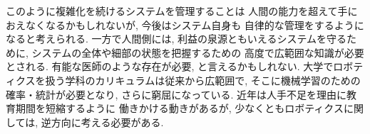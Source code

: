 \documentclass[twocolumn]{jarticle} %
\begin{document}
このように複雑化を続けるシステムを管理することは
人間の能力を超えて手におえなくなるかもしれないが, 
今後はシステム自身も
自律的な管理をするようになると考えられる. 
一方で人間側には, 
利益の泉源ともいえるシステムを守るために, 
システムの全体や細部の状態を把握するための
高度で広範囲な知識が必要とされる. 
有能な医師のような存在が必要, と言えるかもしれない. 
大学でロボティクスを扱う学科のカリキュラムは従来から広範囲で, 
そこに機械学習のための確率・統計が必要となり, 
さらに窮屈になっている. 
近年は人手不足を理由に教育期間を短縮するように
働きかける動きがあるが, 
少なくともロボティクスに関しては, 
逆方向に考える必要がある. 







\small
%
%
\end{document}
